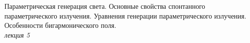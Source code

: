 
\begin{leftrules}
Параметрическая генерация света. Основные свойства спонтанного параметрического излучения. Уравнения генерации параметрического излучения. Особенности бигармонического поля.
\\ \phantom{42} \hfill \textit{лекция 5} 
\end{leftrules}

